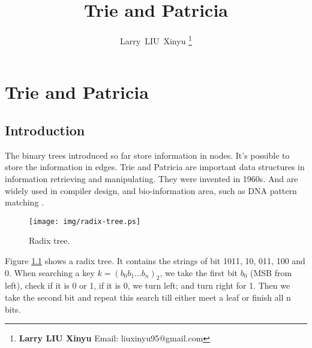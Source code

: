 \documentclass{article}
\begin{document}
\fi


\title{Trie and Patricia}

\author{Larry~LIU~Xinyu
\thanks{{\bfseries Larry LIU Xinyu } \newline
  Email: liuxinyu95@gmail.com \newline}
  }


\maketitle

\ifx\wholebook\relax
\chapter{Trie and Patricia}
\fi



\section{Introduction}
\label{introduction}

The binary trees introduced so far store information in nodes. It's
possible to store the information in edges.
Trie and Patricia are important data structures in
information retrieving and manipulating.
They were invented in 1960s. And are widely used in
compiler design\cite{okasaki-int-map}, and bio-information area, such as
DNA pattern matching \cite{wiki-suffix-tree}.

\begin{figure}[htbp]
  \centering
  \texttt{[image: img/radix-tree.ps]}
  \caption{Radix tree.} \label{fig:radix-tree}
\end{figure}

Figure \ref{fig:radix-tree} shows a radix tree\cite{CLRS}. It contains the
strings of bit 1011, 10, 011, 100 and 0. When searching a key $k=(b_0b_1...b_n)_2$, we
take the first bit $b_0$ (MSB from left), check if it is 0 or 1, if it
is 0, we turn left; and turn right for 1. Then we take the second bit and
repeat this search till either meet a leaf or finish all n bits.
\end{document}
